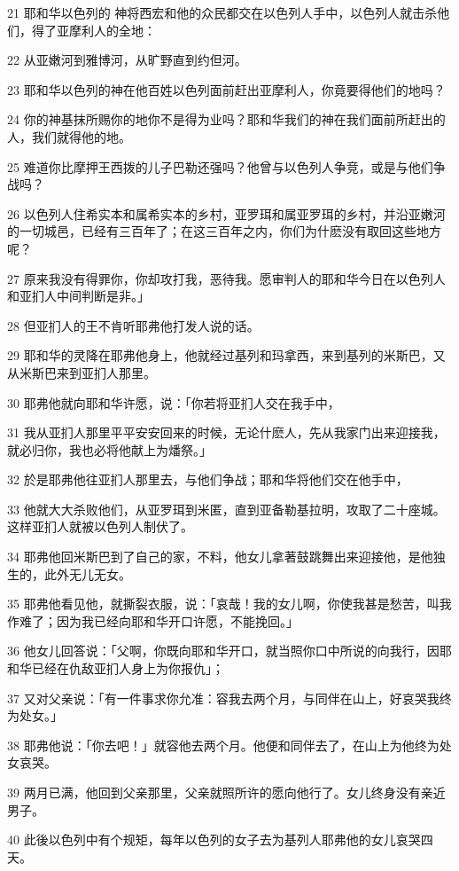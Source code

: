 \par 21 耶和华以色列的 神将西宏和他的众民都交在以色列人手中，以色列人就击杀他们，得了亚摩利人的全地：
\par 22 从亚嫩河到雅博河，从旷野直到约但河。
\par 23 耶和华以色列的神在他百姓以色列面前赶出亚摩利人，你竟要得他们的地吗？
\par 24 你的神基抹所赐你的地你不是得为业吗？耶和华我们的神在我们面前所赶出的人，我们就得他的地。
\par 25 难道你比摩押王西拨的儿子巴勒还强吗？他曾与以色列人争竞，或是与他们争战吗？
\par 26 以色列人住希实本和属希实本的乡村，亚罗珥和属亚罗珥的乡村，并沿亚嫩河的一切城邑，已经有三百年了；在这三百年之内，你们为什麽没有取回这些地方呢？
\par 27 原来我没有得罪你，你却攻打我，恶待我。愿审判人的耶和华今日在以色列人和亚扪人中间判断是非。」
\par 28 但亚扪人的王不肯听耶弗他打发人说的话。
\par 29 耶和华的灵降在耶弗他身上，他就经过基列和玛拿西，来到基列的米斯巴，又从米斯巴来到亚扪人那里。
\par 30 耶弗他就向耶和华许愿，说：「你若将亚扪人交在我手中，
\par 31 我从亚扪人那里平平安安回来的时候，无论什麽人，先从我家门出来迎接我，就必归你，我也必将他献上为燔祭。」
\par 32 於是耶弗他往亚扪人那里去，与他们争战；耶和华将他们交在他手中，
\par 33 他就大大杀败他们，从亚罗珥到米匿，直到亚备勒基拉明，攻取了二十座城。这样亚扪人就被以色列人制伏了。
\par 34 耶弗他回米斯巴到了自己的家，不料，他女儿拿著鼓跳舞出来迎接他，是他独生的，此外无儿无女。
\par 35 耶弗他看见他，就撕裂衣服，说：「哀哉！我的女儿啊，你使我甚是愁苦，叫我作难了；因为我已经向耶和华开口许愿，不能挽回。」
\par 36 他女儿回答说：「父啊，你既向耶和华开口，就当照你口中所说的向我行，因耶和华已经在仇敌亚扪人身上为你报仇」；
\par 37 又对父亲说：「有一件事求你允准：容我去两个月，与同伴在山上，好哀哭我终为处女。」
\par 38 耶弗他说：「你去吧！」就容他去两个月。他便和同伴去了，在山上为他终为处女哀哭。
\par 39 两月已满，他回到父亲那里，父亲就照所许的愿向他行了。女儿终身没有亲近男子。
\par 40 此後以色列中有个规矩，每年以色列的女子去为基列人耶弗他的女儿哀哭四天。

